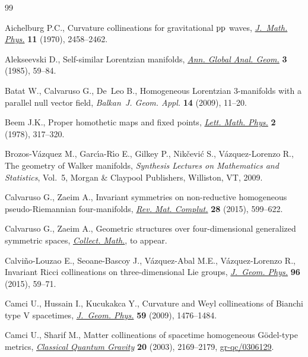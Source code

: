 \begin{thebibliography}{99}
\footnotesize\itemsep=-0.5pt

Aichelburg P.C., Curvature collineations for gravitational {${\rm pp}$} waves,
 \href{http://dx.doi.org/10.1063/1.1665410}{\textit{J.~Math. Phys.}} \textbf{11} (1970), 2458--2462.

Alekseevski D., Self-similar {L}orentzian manifolds, \href{http://dx.doi.org/10.1007/BF00054491}{\textit{Ann. Global Anal.
 Geom.}} \textbf{3} (1985), 59--84.

Batat W., Calvaruso G., De~Leo B., Homogeneous {L}orentzian 3-manifolds with a
 parallel null vector f\/ield, \textit{Balkan~J. Geom. Appl.} \textbf{14}
 (2009), 11--20.

Beem J.K., Proper homothetic maps and f\/ixed points, \href{http://dx.doi.org/10.1007/BF00419621}{\textit{Lett. Math. Phys.}}
 \textbf{2} (1978), 317--320.

Brozos-V{\'a}zquez M., Garc{\'{\i}}a-R{\'{\i}}o E., Gilkey P.,
 Nik{\v{c}}evi{\'c} S., V{\'a}zquez-Lorenzo R., The geometry of {W}alker
 manifolds, \textit{Synthesis Lectures on Mathematics and Statistics}, Vol.~5,
 Morgan \& Claypool Publishers, Williston, VT, 2009.

Calvaruso G., Zaeim A., Invariant symmetries on non-reductive homogeneous
 pseudo-{R}iemannian four-manifolds, \href{http://dx.doi.org/10.1007/s13163-015-0168-8}{\textit{Rev. Mat. Complut.}} \textbf{28}
 (2015), 599--622.

Calvaruso G., Zaeim A., Geometric structures over four-dimensional generalized
 symmetric spaces, \href{http://dx.doi.org/10.1007/s13348-016-0173-3}{\textit{Collect. Math.}}, {t}o appear.

Calvi{\~n}o-Louzao E., Seoane-Bascoy J., V{\'a}zquez-Abal M.E.,
 V{\'a}zquez-Lorenzo R., Invariant {R}icci collineations on three-dimensional
 {L}ie groups, \href{http://dx.doi.org/10.1016/j.geomphys.2015.06.005}{\textit{J.~Geom. Phys.}} \textbf{96} (2015), 59--71.

Camci U., Hussain I., Kucukakca Y., Curvature and {W}eyl collineations of
 {B}ianchi type {V} spacetimes, \href{http://dx.doi.org/10.1016/j.geomphys.2009.07.008}{\textit{J.~Geom. Phys.}} \textbf{59} (2009),
 1476--1484.

Camci U., Sharif M., Matter collineations of spacetime homogeneous
 {G}\"odel-type metrics, \href{http://dx.doi.org/10.1088/0264-9381/20/11/316}{\textit{Classical Quantum Gravity}} \textbf{20}
 (2003), 2169--2179, \href{http://arxiv.org/abs/gr-qc/0306129}{gr-qc/0306129}.


\end{thebibliography}
